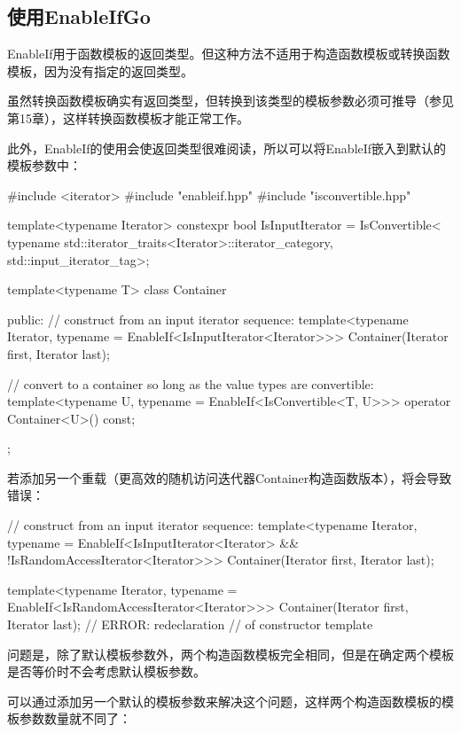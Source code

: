 \subsection{使用EnableIfGo}

EnableIf用于函数模板的返回类型。但这种方法不适用于构造函数模板或转换函数模板，因为没有指定的返回类型。

\begin{notice}
虽然转换函数模板确实有返回类型，但转换到该类型的模板参数必须可推导（参见第15章），这样转换函数模板才能正常工作。
\end{notice}

此外，EnableIf的使用会使返回类型很难阅读，所以可以将EnableIf嵌入到默认的模板参数中：

\begin{cpp}
#include <iterator>
#include "enableif.hpp"
#include "isconvertible.hpp"

template<typename Iterator>
constexpr bool IsInputIterator =
	IsConvertible<
		typename std::iterator_traits<Iterator>::iterator_category,
		std::input_iterator_tag>;

template<typename T>
class Container {
	public:
	// construct from an input iterator sequence:
	template<typename Iterator,
			typename = EnableIf<IsInputIterator<Iterator>>>
	Container(Iterator first, Iterator last);
	
	// convert to a container so long as the value types are convertible:
	template<typename U, typename = EnableIf<IsConvertible<T, U>>>
	operator Container<U>() const;
};
\end{cpp}

若添加另一个重载（更高效的随机访问迭代器Container构造函数版本），将会导致错误：

\begin{cpp}
// construct from an input iterator sequence:
template<typename Iterator,
		typename = EnableIf<IsInputIterator<Iterator> &&
							!IsRandomAccessIterator<Iterator>>>
Container(Iterator first, Iterator last);

template<typename Iterator,
		typename = EnableIf<IsRandomAccessIterator<Iterator>>>
Container(Iterator first, Iterator last); // ERROR: redeclaration
										  // of constructor template
\end{cpp}

问题是，除了默认模板参数外，两个构造函数模板完全相同，但是在确定两个模板是否等价时不会考虑默认模板参数。

可以通过添加另一个默认的模板参数来解决这个问题，这样两个构造函数模板的模板参数数量就不同了：

